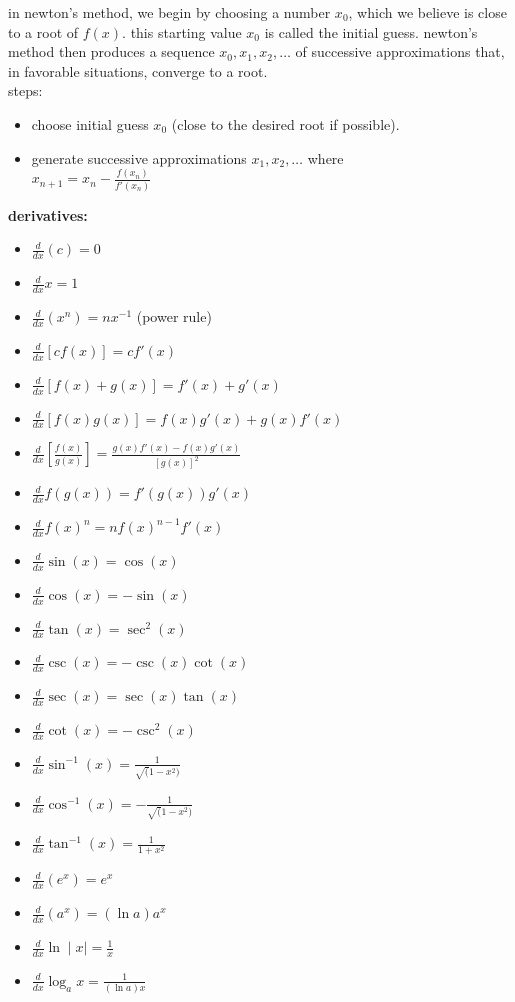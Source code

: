\documentclass{article}
\begin{document}
in newton's method, we begin by choosing a number $x_0$, which we believe is close to a root of $f(x)$. this starting value $x_0$ is called the initial guess. newton's method then produces a sequence $x_0, x_1, x_2, \ldots$ of successive approximations that, in favorable situations, converge to a root.\\

steps:
	\begin{itemize}
		\item choose initial guess $x_0$ (close to the desired root if possible).
		\item generate successive approximations $x_1, x_2, \ldots$ where\\ $x_{n + 1} = x_n - \frac{f(x_n)}{f'(x_n)}$
	\end{itemize}

\textbf{derivatives:}
	\begin{itemize}
		\item $\frac{d}{dx}(c) = 0$
		\item $\frac{d}{dx}x = 1$
		\item $\frac{d}{dx}(x^n) = nx^{-1}$ (power rule)
		\item $\frac{d}{dx}[cf(x)] = cf'(x)$
		\item $\frac{d}{dx}[f(x)+g(x)] = f'(x) + g'(x)$
		\item $\frac{d}{dx}[f(x)g(x)] = f(x)g'(x) + g(x)f'(x)$
		\item $\frac{d}{dx}[\frac{f(x)}{g(x)}] = \frac{g(x)f'(x) - f(x)g'(x)}{[g(x)]^2}$
		\item $\frac{d}{dx}f(g(x)) = f'(g(x))g'(x)$
		\item $\frac{d}{dx}f(x)^n = nf(x)^{n-1}f'(x)$
		\item $\frac{d}{dx}\sin(x) = \cos(x)$
		\item $\frac{d}{dx}\cos(x) = -\sin(x)$
		\item $\frac{d}{dx}\tan(x) = \sec^2(x)$
		\item $\frac{d}{dx}\csc(x) = -\csc(x)\cot(x)$
		\item $\frac{d}{dx}\sec(x) = \sec(x)\tan(x)$
		\item $\frac{d}{dx}\cot(x) = -\csc^2(x)$
		\item $\frac{d}{dx}\sin^{-1}(x) = \frac{1}{\sqrt(1 - x^2)}$
		\item $\frac{d}{dx}\cos^{-1}(x) = -\frac{1}{\sqrt(1 - x^2)}$
		\item $\frac{d}{dx}\tan^{-1}(x) = \frac{1}{1 + x^2}$
		\item $\frac{d}{dx}(e^x) = e^x$
		\item $\frac{d}{dx}(a^x) = (\ln a)a^x$
		\item $\frac{d}{dx}\ln\mid x\mid = \frac{1}{x}$
		\item $\frac{d}{dx}\log_ax = \frac{1}{(\ln a)x}$
	\end{itemize}
\end{document}
